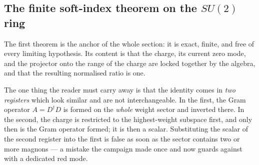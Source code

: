 
\subsection{The finite soft-index theorem on the \texorpdfstring{$SU(2)$}{SU(2)} ring}

The first theorem is the anchor of the whole section: it is exact, finite, and
free of every limiting hypothesis. Its content is that the charge, its current
zero mode, and the projector onto the range of the charge are locked together
by the algebra, and that the resulting normalised ratio is one.

The one thing the reader must carry away is that the identity comes in
\emph{two registers} which look similar and are not interchangeable. In the
first, the Gram operator $A=D^\dagger D$ is formed on the \emph{whole} weight
sector and inverted there. In the second, the charge is restricted to the
highest-weight subspace first, and only then is the Gram operator formed; it
is then a scalar. Substituting the scalar of the second register into the
first is false as soon as the sector contains two or more magnons --- a mistake
the campaign made once and now guards against with a dedicated red mode.

